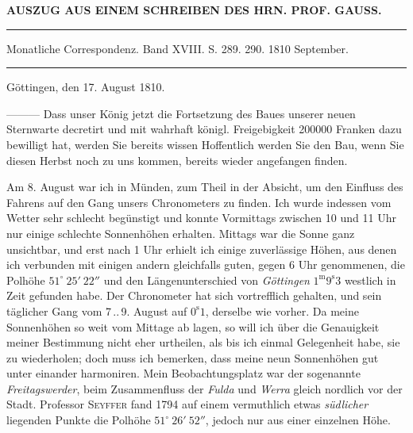 \clearpage{}\hypertarget{native-323-lower}{}\label{native-323-lower}

\begin{center}\textbf{AUSZUG AUS EINEM SCHREIBEN DES HRN. PROF. GAUSS.}\par\vspace{4pt}\hrule\vspace{4pt}\fontsize{10}{12}\selectfont Monatliche Correspondenz. Band XVIII. S. 289. 290. 1810 September.\par\vspace{4pt}\hrule\vspace{4pt}\end{center}
\begin{flushright}Göttingen, den 17. August 1810.\end{flushright}

\par\indent ---\enspace---\enspace--- Dass unser König jetzt die Fortsetzung des Baues unserer neuen Sternwarte decretirt und mit wahrhaft königl. Freigebigkeit 200000 Franken dazu bewilligt hat, werden Sie bereits wissen
Hoffentlich werden Sie den Bau, wenn Sie diesen Herbst noch zu uns kommen, bereits wieder angefangen finden.

Am 8. August war ich in Münden, zum Theil in der Absicht, um den Einfluss des Fahrens auf den Gang unsers Chronometers zu finden. Ich wurde indessen vom Wetter sehr schlecht begünstigt und konnte Vormittags zwischen 10 und 11 Uhr nur einige schlechte Sonnenhöhen erhalten. Mittags war die Sonne ganz unsichtbar, und erst nach 1 Uhr erhielt ich einige zuverlässige Höhen, aus denen ich verbunden mit einigen andern gleichfalls guten, gegen 6 Uhr genommenen, die Polhöhe $51^\circ\ 25'\ 22''$ und den Längenunterschied von \emph{Göttingen} $1^{\text{m}}9^{\text{s}}3$ westlich in Zeit gefunden habe. Der Chronometer hat sich vortrefflich gehalten, und sein täglicher Gang vom 7\,..\,9. August auf $0^{\text{s}}1$, derselbe wie vorher. Da meine Sonnenhöhen so weit vom Mittage ab lagen, so will ich über die Genauigkeit meiner Bestimmung nicht eher urtheilen, als bis ich einmal Gelegenheit habe, sie zu wiederholen; doch muss ich bemerken, dass meine neun Sonnenhöhen gut unter einander harmoniren. Mein Beobachtungsplatz war der sogenannte \emph{Freitagswerder}, beim Zusammenfluss der \emph{Fulda} und \emph{Werra} gleich nordlich  vor der Stadt. Professor \textsc{Seyffer} fand 1794 auf einem vermuthlich etwas \emph{südlicher} liegenden Punkte die Polhöhe $51^\circ\ 26'\ 52''$, jedoch nur aus einer einzelnen Höhe.
\clearpage{}

